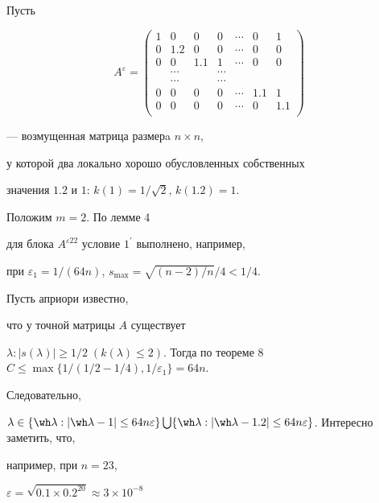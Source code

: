 \begin{exam}


Пусть 


$$


A^{\varepsilon}=\begin{pmatrix}


1 & 0 & 0 & 0 & \dotsb & 0 & 1 \\


0 &  1.2 & 0 & 0 &\dotsb & 0 & 0  \\


0 &  0 & 1.1 & 1 & \dotsb & 0 & 0 \\


 & \dotsb &  & \dotsb &  &  \\


 & \dotsb &  & \dotsb &  &  \\


0 & 0 & 0 & 0 & \dotsb & 1.1 & 1 \\


0 & 0 & 0 & 0 & \dotsb & 0 & 1.1\\


\end{pmatrix}


$$


--- возмущенная матрица размерa $n\times n$,


у которой два локально хорошо обусловленных собственных


значения $1.2$ и $1$: $k(1)=1/\sqrt{2}$, $k(1.2)=1$. 


Положим $m=2$. По лемме 4


для блока $A^{\varepsilon 22}$ условие $1^{\prime}$ выполнено, например,


при $\varepsilon_1=1/(64 n)$, $s_{\max}=\sqrt{(n-2)/n}/4<1/4$. 


Пусть априори известно,


что у точной матрицы $A$ существует


$\lambda: |s(\lambda)|\ge 1/2 \;(k(\lambda)


\le 2)$. Тогда по теореме 8\; $C\le\max\{1/(1/2-1/4),1/\varepsilon_1\}=64 n$.


Следовательно,


$\lambda\in \{\wh\lambda:|\wh\lambda-1|\le 64 n\varepsilon\}\bigcup


\{\wh\lambda:|\wh\lambda-1.2|\le 64 n\varepsilon\}$. Интересно заметить, что,


например, при $n=23$,


$\varepsilon=\sqrt{0.1\times 0.2^{20}}\approx 3\times 10^{-8}$



\end{exam}
